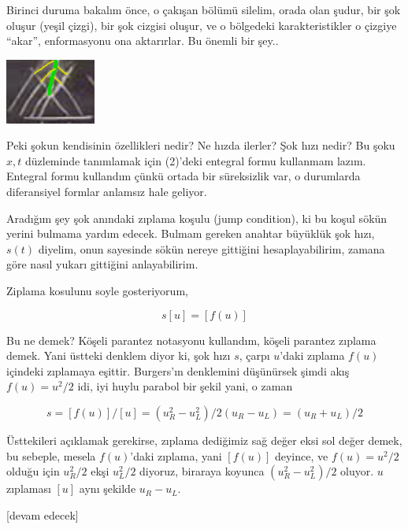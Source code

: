 \documentclass[12pt,fleqn]{article}\usepackage{../../common}
\begin{document}
Birinci duruma bakalım önce, o çakışan bölümü silelim, orada olan şudur,
bir şok oluşur (yeşil çizgi), bir şok cizgisi oluşur, ve o bölgedeki
karakteristikler o çizgiye ``akar'', enformasyonu ona aktarırlar. Bu
önemli bir şey..

\includegraphics[width=8em]{compscieng_2_09_02.png}

Peki şokun kendisinin özellikleri nedir? Ne hızda ilerler? Şok hızı nedir?  Bu
şoku $x,t$ düzleminde tanımlamak için (2)'deki entegral formu kullanmam lazım.
Entegral formu kullandım çünkü ortada bir süreksizlik var, o durumlarda
diferansiyel formlar anlamsız hale geliyor.

Aradığım şey şok anındaki zıplama koşulu (jump condition), ki bu koşul sökün
yerini bulmama yardım edecek. Bulmam gereken anahtar büyüklük şok hızı, $s(t)$
diyelim, onun sayesinde sökün nereye gittiğini hesaplayabilirim, zamana göre
nasıl yukarı gittiğini anlayabilirim.

Ziplama kosulunu soyle gosteriyorum,

$$
s [u] = [f(u)]
$$

Bu ne demek? Köşeli parantez notasyonu kullandım, köşeli parantez zıplama
demek. Yani üstteki denklem diyor ki, şok hızı $s$, çarpı $u$'daki zıplama
$f(u)$ içindeki zıplamaya eşittir.  Burgers'ın denklemini düşünürsek şimdi akış
$f(u) = u^2/2$ idi, iyi huylu parabol bir şekil yani, o zaman

$$
s = [f(u)]/[u] = (u_R^2 - u_L^2) / 2 (u_R-u_L) = (u_R + u_L) / 2
$$

Üsttekileri açıklamak gerekirse, zıplama dediğimiz sağ değer eksi sol değer
demek, bu sebeple, mesela $f(u)$'daki zıplama, yani $[f(u)]$ deyince, ve
$f(u) = u^2/2$ olduğu için $u_R^2/2$ ekşi $u_L^2/2$ diyoruz, biraraya koyunca
$(u_R^2 - u_L^2) / 2$ oluyor. $u$ zıplaması $[u]$ aynı şekilde $u_R - u_L$. 












[devam edecek]
\end{document}

